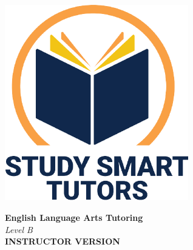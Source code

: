 \documentclass[12pt]{article}
\begin{document}
\newpage




\thispagestyle{empty}

\vspace*{\fill}

\vspace*{3cm}

\begin{center}

    \includegraphics[width=0.6\textwidth]{SST_Color_Logo.png} %
    
    \vspace{2cm} %
    

    
    \Huge \textbf{English Language Arts  Tutoring}\\ [0.3cm]
     \vspace{1.5cm}
    \LARGE \textit{Level B}\\[1cm] 
   

    \Huge \textbf{INSTRUCTOR VERSION}
    
   
    
    \vfill %
    
\end{center}

\newpage








\newpage



\end{document}
